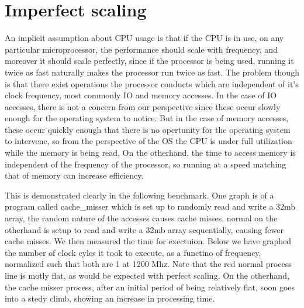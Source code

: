 \section{Imperfect scaling}\label{sec:case-study}

An implicit assumption about CPU usage is that if the CPU is in use, on any particular microprocessor, the performance should scale with frequency, and moreover it should scale perfectly, since if the processor is being used, running it twice as fast naturally makes the processor run twice as fast. The problem though is that there exist operations the processor conducts which are independent of it's clock frequency, most commonly IO and memory accesses. In the case of IO accesses, there is not a concern from our perspective since these occur slowly enough for the operating system to notice. But in the case of memory accesses, these occur quickly enough that there is no opertunity for the operating system to intervene, so from the perspective of the OS the CPU is under full utilization while the memory is being read, On the otherhand, the time to access memory is independent of the frequency of the processor, so running at a speed matching that of memory can increase efficiency.

This is demonstrated clearly in the following benchmark. One graph is of a program called cache\_misser which is set up to randomly read and write a 32mb array, the random nature of the accesses causes cache misses. normal on the otherhand is setup to read and write a 32mb array sequentially, causing fewer cache misses. We then measured the time for exectuion. Below we have graphed the number of clock cyles it took to execute, as a functino of frequency, normalized such that both are 1 at 1200 Mhz. Note that the red normal process line is motly flat, as would be expected with perfect scaling. On the otherhand, the cache misser process, after an initial period of being relatively flat, soon goes into a stedy climb, showing an increase in processing time.

\fi


